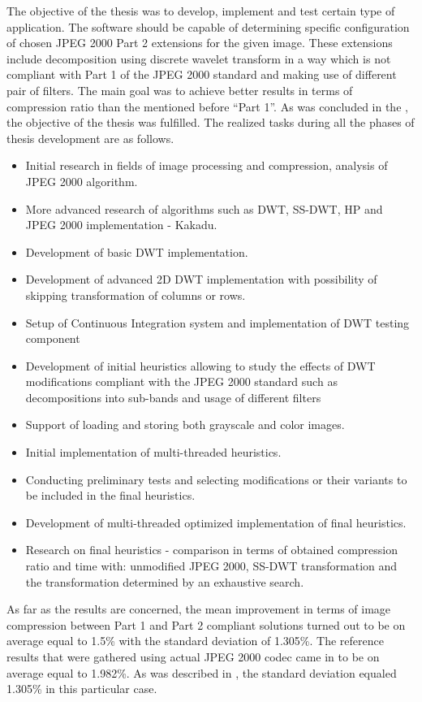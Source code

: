 The objective of the thesis was to develop, implement and test certain type of application. The software
should be capable of determining specific configuration of chosen JPEG 2000 Part 2 extensions for
the given image. These extensions include decomposition using discrete wavelet transform in a way
which is not compliant with Part 1 of the JPEG 2000 standard and making use of different pair of filters.
The main goal was to achieve better results in terms of compression ratio than the mentioned before
``Part 1''. As was concluded in the , the objective of the thesis was fulfilled.
The realized tasks during all the phases of thesis development are as follows.
\begin{itemize}
    \item Initial research in fields of image processing and compression, analysis of JPEG 2000 algorithm. 
    \item More advanced research of algorithms such as DWT, SS-DWT, HP and JPEG 2000 implementation - Kakadu.
    \item Development of basic DWT implementation.
    \item Development of advanced 2D DWT implementation with possibility of skipping transformation of columns or rows.
    \item Setup of Continuous Integration system and implementation of DWT testing component 
    \item Development of initial heuristics allowing to study the effects of DWT modifications compliant
    with the JPEG 2000 standard such as decompositions into sub-bands and usage of different filters
    \item Support of loading and storing both grayscale and color images.
    \item Initial implementation of multi-threaded heuristics.
    \item Conducting preliminary tests and selecting modifications or their variants to be included in the final heuristics.
    \item Development of multi-threaded optimized implementation of final heuristics.
    \item Research on final heuristics - comparison in terms of obtained compression ratio and time with: unmodified JPEG 2000,
    SS-DWT transformation and the transformation determined by an exhaustive search.
\end{itemize}

As far as the results are concerned, the mean improvement in terms of image compression between
Part 1 and Part 2 compliant solutions turned out to be on average equal to 1.5\% with the
standard deviation of 1.305\%. The reference results that were gathered using actual JPEG 2000
codec came in to be on average equal to 1.982\%. As was described in ,
the standard deviation equaled 1.305\% in this particular case.

